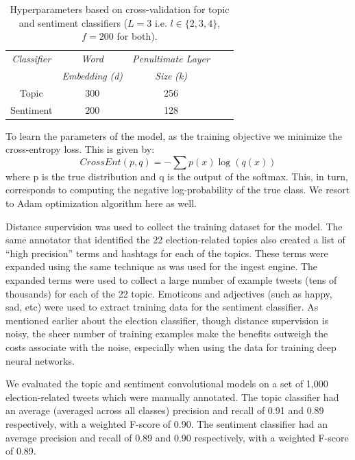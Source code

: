 \documentclass[letterpaper]{article}
\begin{document}
\begin{table}[]%
\centering
\small
\begin{adjustbox}{width=0.64\columnwidth}
\begin{tabular}{ |c|c|c|c|c| }
\hline %
\emph{Classifier} & \emph{Word}    & \emph{Penultimate Layer} \\
&   \emph{Embedding} \emph{(d)} & \emph{Size} \emph{(k)} \\\hline %
Topic & $300$ &  256  \\\hline
Sentiment &$200$ &  128 \\\hline

\end{tabular}
\end{adjustbox}
\caption{Hyperparameters based on cross-validation for topic and sentiment classifiers ($L=3$ i.e. $l\in \{2,3,4\}$, $f=200$ for both). }
\label{topic_sent} %
\end{table}


To learn the parameters of the model, as the training objective we minimize the cross-entropy loss. This is given by:
\begin{equation}\label{cat_ce} CrossEnt(p,q)=-\sum p(x)\log(q(x))\end{equation}
where p is the true distribution and q is the output of the softmax. This, in turn, corresponds to computing the negative log-probability of the true class. We resort to Adam optimization algorithm \cite{kingma2014adam} here as well.

Distance supervision was used to collect the training dataset for the model. The same annotator that identified the 22 election-related topics also created a list of ``high precision'' terms and hashtags for each of the topics. These terms were expanded using the same technique as was used for the ingest engine. The expanded terms were used to collect a large number of example tweets (tens of thousands) for each of the 22 topic. Emoticons and adjectives (such as happy, sad, etc) were used to extract training data for the sentiment classifier. As mentioned earlier about the election classifier, though distance supervision is noisy, the sheer number of training examples make the benefits outweigh the costs associate with the noise, especially when using the data for training deep neural networks.

We evaluated the topic and sentiment convolutional models on a set of 1,000 election-related tweets which were manually annotated. The topic classifier had an average (averaged across all classes) precision and recall of 0.91 and 0.89 respectively, with a weighted F-score of 0.90. The sentiment classifier had an average precision and recall of 0.89 and 0.90 respectively, with a weighted F-score of 0.89.
\end{document}
